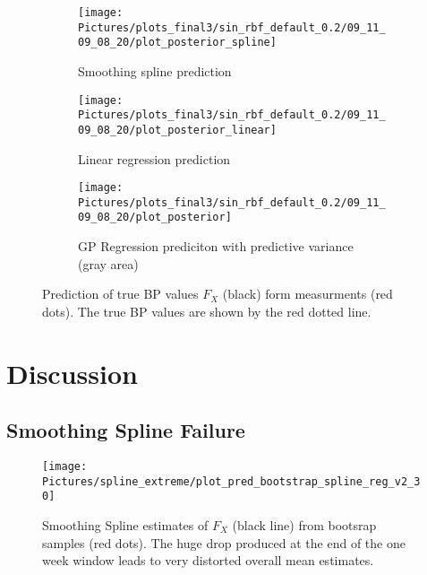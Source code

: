 \begin{figure}[!ht]
\centering

\begin{subfigure}{.45\textwidth}
    \centering
    \texttt{[image: Pictures/plots\_final3/sin\_rbf\_default\_0.2/09\_11\_09\_08\_20/plot\_posterior\_spline]}
  \caption[Spline]{Smoothing spline prediction}
  \label{fig:ex2-spline}
\end{subfigure}\hfill
\begin{subfigure}{.45\textwidth}
    \centering
    \texttt{[image: Pictures/plots\_final3/sin\_rbf\_default\_0.2/09\_11\_09\_08\_20/plot\_posterior\_linear]}
  \caption[Linear Regression]{Linear regression prediction}
  \label{fig:ex2-linear}
\end{subfigure}
\begin{subfigure}{0.6\textwidth}
    \centering
    \texttt{[image: Pictures/plots\_final3/sin\_rbf\_default\_0.2/09\_11\_09\_08\_20/plot\_posterior]}
  \caption[GP Prediction]{GP Regression prediciton with predictive variance (gray area)}
  \label{fig:ex2-gp}
\end{subfigure}
\caption[True BP value prediction]{Prediction of true BP values $F_X$ (black) form measurments (red dots). The true BP values are shown
by the red dotted line. }
\label{fig:ex2}
\end{figure}




\chapter{Discussion}
\section{Smoothing Spline Failure}

\begin{figure}[!ht]
\centering
\texttt{[image: Pictures/spline\_extreme/plot\_pred\_bootstrap\_spline\_reg\_v2\_30]}
\caption[Smoothing Spline Failure]{Smoothing Spline estimates of $F_X$ (black line)
    from bootsrap samples (red dots). The huge drop produced at the end of the one week window
    leads to very distorted overall mean estimates.}
\label{fig:ex2-gp-prediction}
\end{figure}






